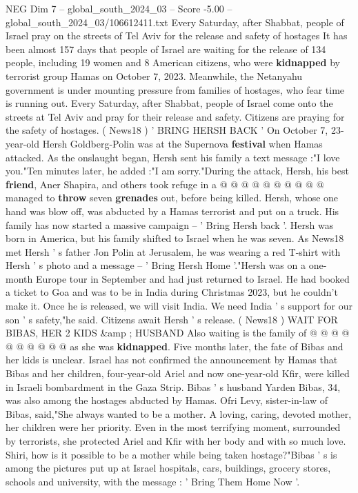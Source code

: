 \begin{textsample}{NEG Dim 7 – global\_south\_2024\_03 – Score -5.00 – global\_south\_2024\_03/106612411.txt}  \label{ex:f7_neg_422}
Every Saturday, after Shabbat, people of Israel pray on the streets of Tel Aviv for the release and safety of hostages It has been almost 157 days that people of Israel are waiting for the release of 134 people, including 19 women and 8 American citizens, who were \textbf{kidnapped} by terrorist group Hamas on October 7, 2023.
Meanwhile, the Netanyahu government is under mounting pressure from families of hostages, who fear time is running out.
Every Saturday, after Shabbat, people of Israel come onto the streets at Tel Aviv and pray for their release and safety.
Citizens are praying for the safety of hostages. ( News18 ) ' BRING HERSH BACK ' On October 7, 23-year-old Hersh Goldberg-Polin was at the Supernova \textbf{festival} when Hamas attacked.
As the onslaught began, Hersh sent his family a text message :"I love you."Ten minutes later, he added :"I am sorry."During the attack, Hersh, his best \textbf{friend}, Aner Shapira, and others took refuge in a @ @ @ @ @ @ @ @ @ @ managed to \textbf{throw} seven \textbf{grenades} out, before being killed.
Hersh, whose one hand was blow off, was abducted by a Hamas terrorist and put on a truck.
His family has now started a massive campaign -- ' Bring Hersh back '.
Hersh was born in America, but his family shifted to Israel when he was seven.
As News18 met Hersh ' s father Jon Polin at Jerusalem, he was wearing a red T-shirt with Hersh ' s photo and a message -- ' Bring Hersh Home '."Hersh was on a one-month Europe tour in September and had just returned to Israel.
He had booked a ticket to Goa and was to be in India during Christmas 2023, but he couldn't make it.
Once he is released, we will visit India.
We need India ' s support for our son ' s safety,"he said.
Citizens await Hersh ' s release. ( News18 ) WAIT FOR BIBAS, HER 2 KIDS \&amp ; HUSBAND Also waiting is the family of @ @ @ @ @ @ @ @ @ @ as she was \textbf{kidnapped}.
Five months later, the fate of Bibas and her kids is unclear.
Israel has not confirmed the announcement by Hamas that Bibas and her children, four-year-old Ariel and now one-year-old Kfir, were killed in Israeli bombardment in the Gaza Strip.
Bibas ' s husband Yarden Bibas, 34, was also among the hostages abducted by Hamas.
Ofri Levy, sister-in-law of Bibas, said,"She always wanted to be a mother.
A loving, caring, devoted mother, her children were her priority.
Even in the most terrifying moment, surrounded by terrorists, she protected Ariel and Kfir with her body and with so much love.
Shiri, how is it possible to be a mother while being taken hostage?"Bibas ' s is among the pictures put up at Israel hospitals, cars, buildings, grocery stores, schools and university, with the message : ' Bring Them Home Now '.

\end{textsample}
